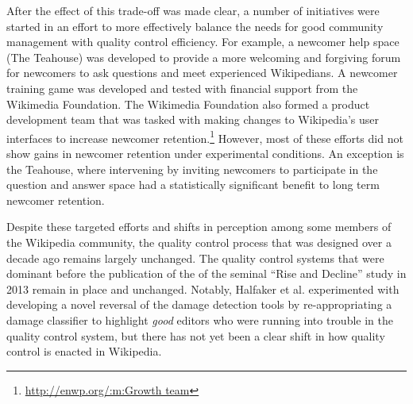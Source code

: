 After the effect of this trade-off was made clear, a number of initiatives were started in an effort to more effectively balance the needs for good community management with quality control efficiency.  For example, a newcomer help space (The Teahouse\cite{morgan2013tea}) was developed to provide a more welcoming and forgiving forum for newcomers to ask questions and meet experienced Wikipedians.  A newcomer training game was developed and tested with financial support from the Wikimedia Foundation\cite{narayan2015effects}.  The Wikimedia Foundation also formed a product development team that was tasked with making changes to Wikipedia's user interfaces to increase newcomer retention.\footnote{\url{http://enwp.org/:m:Growth team}}  However, most of these efforts did not show gains in newcomer retention under experimental conditions.  An exception is the Teahouse, where intervening by inviting newcomers to participate in the question and answer space had a statistically significant benefit to long term newcomer retention\cite{morgan2018evaluating}.

Despite these targeted efforts and shifts in perception among some members of the Wikipedia community, the quality control process that was designed over a decade ago remains largely unchanged\cite{halfaker2014snuggle}.  The quality control systems that were dominant before the publication of the of the seminal ``Rise and Decline'' study in 2013\cite{halfaker2013rise} remain in place and unchanged.  Notably, Halfaker et al. experimented with developing a novel reversal of the damage detection tools by re-appropriating a damage classifier to highlight \emph{good} editors who were running into trouble in the quality control system\cite{halfaker2014snuggle}, but there has not yet been a clear shift in how quality control is enacted in Wikipedia.
